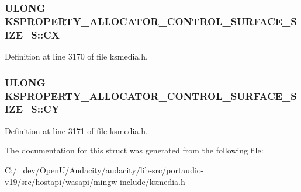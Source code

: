 \subsubsection[{\texorpdfstring{CX}{CX}}]{\setlength{\rightskip}{0pt plus 5cm}U\+L\+O\+NG K\+S\+P\+R\+O\+P\+E\+R\+T\+Y\+\_\+\+A\+L\+L\+O\+C\+A\+T\+O\+R\+\_\+\+C\+O\+N\+T\+R\+O\+L\+\_\+\+S\+U\+R\+F\+A\+C\+E\+\_\+\+S\+I\+Z\+E\+\_\+\+S\+::\+CX}\hypertarget{struct_k_s_p_r_o_p_e_r_t_y___a_l_l_o_c_a_t_o_r___c_o_n_t_r_o_l___s_u_r_f_a_c_e___s_i_z_e___s_a8e91fe99898e9f897909f3a9c350027e}{}\label{struct_k_s_p_r_o_p_e_r_t_y___a_l_l_o_c_a_t_o_r___c_o_n_t_r_o_l___s_u_r_f_a_c_e___s_i_z_e___s_a8e91fe99898e9f897909f3a9c350027e}


Definition at line 3170 of file ksmedia.\+h.

\subsubsection[{\texorpdfstring{CY}{CY}}]{\setlength{\rightskip}{0pt plus 5cm}U\+L\+O\+NG K\+S\+P\+R\+O\+P\+E\+R\+T\+Y\+\_\+\+A\+L\+L\+O\+C\+A\+T\+O\+R\+\_\+\+C\+O\+N\+T\+R\+O\+L\+\_\+\+S\+U\+R\+F\+A\+C\+E\+\_\+\+S\+I\+Z\+E\+\_\+\+S\+::\+CY}\hypertarget{struct_k_s_p_r_o_p_e_r_t_y___a_l_l_o_c_a_t_o_r___c_o_n_t_r_o_l___s_u_r_f_a_c_e___s_i_z_e___s_a4df9c3d5e128ca499548e1466889c635}{}\label{struct_k_s_p_r_o_p_e_r_t_y___a_l_l_o_c_a_t_o_r___c_o_n_t_r_o_l___s_u_r_f_a_c_e___s_i_z_e___s_a4df9c3d5e128ca499548e1466889c635}


Definition at line 3171 of file ksmedia.\+h.



The documentation for this struct was generated from the following file\+:\begin{DoxyCompactItemize}
\item 
C\+:/\+\_\+dev/\+Open\+U/\+Audacity/audacity/lib-\/src/portaudio-\/v19/src/hostapi/wasapi/mingw-\/include/\hyperlink{ksmedia_8h}{ksmedia.\+h}\end{DoxyCompactItemize}

